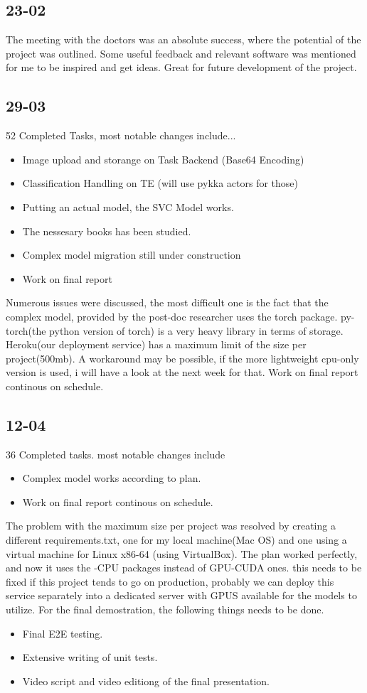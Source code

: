 \documentclass[a4paper,11pt,oneside]{book}
\begin{document}
	\subsection{23-02}
	The meeting with the doctors was an absolute success, where the potential of the project was outlined. Some useful feedback and relevant
	software was mentioned for me to be inspired and get ideas. Great for future development of the project.
	
	\subsection{29-03}
	52 Completed Tasks, most notable changes include...
	\begin{itemize}
		\item Image upload and storange on Task Backend (Base64 Encoding) 
		\item Classification Handling on TE (will use pykka actors for those)
		\item Putting an actual model, the SVC Model works.
		\item The nessesary books has been studied.
		\item Complex model migration still under construction
		\item Work on final report
	\end{itemize}
	Numerous issues were discussed, the most difficult one is the fact that the complex model, provided by the post-doc researcher uses
	the torch package. py-torch(the python version of torch) is a very heavy library in terms of storage. Heroku(our deployment service) 
	has a maximum limit of the size per project(500mb). A workaround may be possible, if the more lightweight cpu-only version is used, i will
	have a look at the next week for that.
	Work on final report continous on schedule.
	\subsection{12-04}
	36 Completed tasks. most notable changes include
	\begin{itemize}
		\item Complex model works according to plan.
		\item Work on final report continous on schedule.
	\end{itemize}
	The problem with the maximum size per project was resolved by creating a different requirements.txt, one for my local machine(Mac OS) and one
	using a virtual machine for Linux x86-64 (using VirtualBox). The plan worked perfectly, and now it uses the -CPU packages instead of GPU-CUDA ones.
	this needs to be fixed if this project tends to go on production, probably we can deploy this service separately into a dedicated server with GPUS available
	for the models to utilize.
	For the final demostration, the following things needs to be done.
	\begin{itemize}
		\item Final E2E testing.
		\item Extensive writing of unit tests.
		\item Video script and video editiong of the final presentation.
	\end{itemize}
\end{document}
